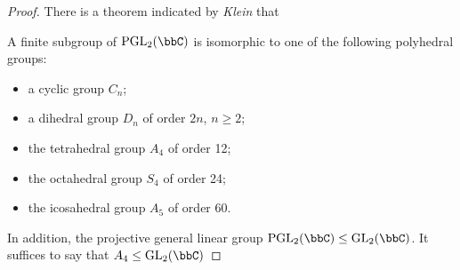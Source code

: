 \begin{proof}
    There is a theorem indicated by \textit{Klein} that 
    \begin{theorem}
        A finite subgroup of $\mathrm{PGL}_2(\bbC)$ is isomorphic to one of the following polyhedral groups:
\begin{itemize}
    \item a cyclic group $C_n$;
    \item a dihedral group $D_n$ of order $2n$, $n \geq2$;
    \item the tetrahedral group $A_4$ of order 12;
    \item the octahedral group $S_4$ of order 24;
    \item the icosahedral group $A_5$ of order 60.
\end{itemize}
    \end{theorem}
    In addition, the projective general linear group $\mathrm{PGL}_2(\bbC)\leq \mathrm{GL}_2(\bbC)$. It suffices to say that $A_4 \leq \mathrm{GL}_2(\bbC)$
\end{proof}